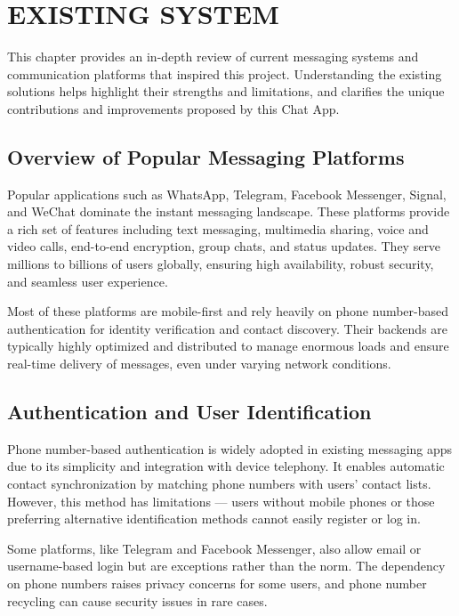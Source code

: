 \documentclass[12pt,a4paper]{report}
\begin{document}
\newpage

\newpage



\chapter{EXISTING SYSTEM}

This chapter provides an in-depth review of current messaging systems and communication platforms that inspired this project. Understanding the existing solutions helps highlight their strengths and limitations, and clarifies the unique contributions and improvements proposed by this Chat App.

\section{Overview of Popular Messaging Platforms}

Popular applications such as WhatsApp, Telegram, Facebook Messenger, Signal, and WeChat dominate the instant messaging landscape. These platforms provide a rich set of features including text messaging, multimedia sharing, voice and video calls, end-to-end encryption, group chats, and status updates. They serve millions to billions of users globally, ensuring high availability, robust security, and seamless user experience.

Most of these platforms are mobile-first and rely heavily on phone number-based authentication for identity verification and contact discovery. Their backends are typically highly optimized and distributed to manage enormous loads and ensure real-time delivery of messages, even under varying network conditions.

\section{Authentication and User Identification}

Phone number-based authentication is widely adopted in existing messaging apps due to its simplicity and integration with device telephony. It enables automatic contact synchronization by matching phone numbers with users' contact lists. However, this method has limitations — users without mobile phones or those preferring alternative identification methods cannot easily register or log in.

Some platforms, like Telegram and Facebook Messenger, also allow email or username-based login but are exceptions rather than the norm. The dependency on phone numbers raises privacy concerns for some users, and phone number recycling can cause security issues in rare cases.
\end{document}
